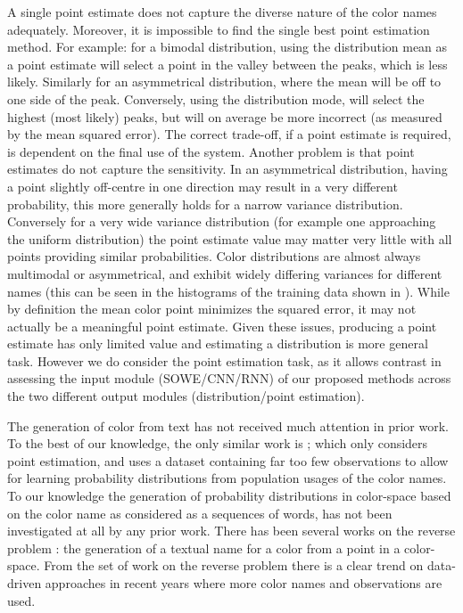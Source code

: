 \documentclass[]{clv3}
\newcommand{\parencite}{\citep}
\newcommand{\textcite}{\citet}
\begin{document}
A single point estimate does not capture the diverse nature of the color names adequately. Moreover, it is impossible to find the single best point estimation method.
For example: for a bimodal distribution, using the distribution mean as a point estimate will select a point in the valley between the peaks, which is less likely.
Similarly for an asymmetrical distribution, where the mean will be off to one side of the peak.
Conversely, using the distribution mode, will select the highest (most likely) peaks, but will on average be more incorrect (as measured by the mean squared error).
The correct trade-off, if a point estimate is required, is dependent on the final use of the system.
Another problem is that point estimates do not capture the sensitivity.
In an asymmetrical distribution, having a point slightly off-centre in one direction may result in a very different probability,
this more generally holds for a narrow variance distribution.
Conversely for a very wide variance distribution (for example one approaching the uniform distribution) the point estimate value may matter very little with all points providing similar probabilities.
Color distributions are almost always multimodal or asymmetrical, and exhibit widely differing variances for different names (this can be seen in the histograms of the training data shown in ).
While by definition the mean color point minimizes the squared error, it may not actually be a  meaningful point estimate.
Given these issues, producing a point estimate has only limited value and estimating a distribution is more general task.
However we do consider the point estimation task, as it allows contrast in assessing the input module (SOWE/CNN/RNN) of our proposed methods across the two different output modules (distribution/point estimation).

The generation of color from text has not received much attention in prior work.
To the best of our knowledge, the only similar work is \textcite{DBLP:journals/corr/KawakamiDRS16};
which only considers point estimation,
and uses a dataset containing far too few observations to allow for learning probability distributions from population usages of the color names.
To our knowledge the generation of probability distributions in color-space based on the color name as considered as a sequences of words, has not been investigated at all by any prior work.
There has been several works on the reverse problem \parencite{mcmahan2015bayesian,meomcmahanstone:color,2016arXiv160603821M}: the generation of a textual name for a color from a point in a color-space.
From the set of work on the reverse problem there is a clear trend on data-driven approaches in recent years where more color names and observations are used.
\end{document}
